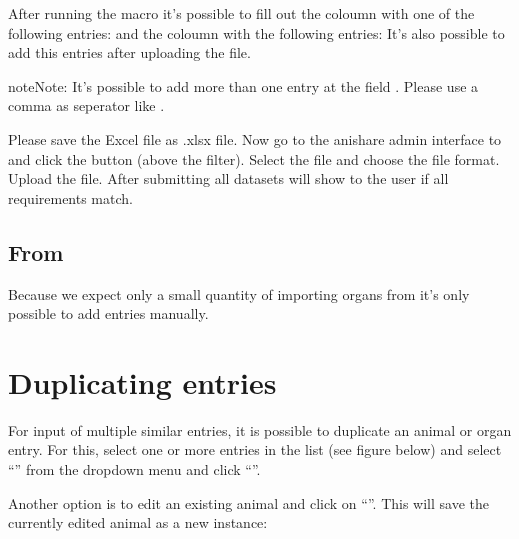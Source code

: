 \documentclass[letterpaper,10pt,openany,oneside,english]{sphinxmanual}
\begin{document}
After running the macro it’s possible to fill out the coloumn  with one of the following entries:
 and
the coloumn  with the following entries:
It’s also possible to add this entries after uploading the file.

\begin{sphinxadmonition}{note}{Note:}
It’s possible to add more than one entry at the field . Please use a comma as seperator like .
\end{sphinxadmonition}

Please save the Excel file as .xlsx file. Now go to the anishare admin interface to 
and click the button  (above the filter). Select the file and choose the file format. Upload the file. After submitting all datasets will show to
the user if all requirements match.


\subsection{From }
\label{\detokenize{index:id2}}
Because we expect only a small quantity of importing organs from  it’s only possible to add entries manually.


\section{Duplicating entries}
\label{\detokenize{index:duplicating-entries}}
For input of multiple similar entries, it is possible to duplicate an animal or organ entry. For this, select one
or more entries in the list (see figure below) and select “” from the dropdown menu and click
“”.

\noindent{}

Another option is to edit an existing animal and click on “”. This will save the
currently edited animal as a new instance:

\noindent{}
\end{document}
